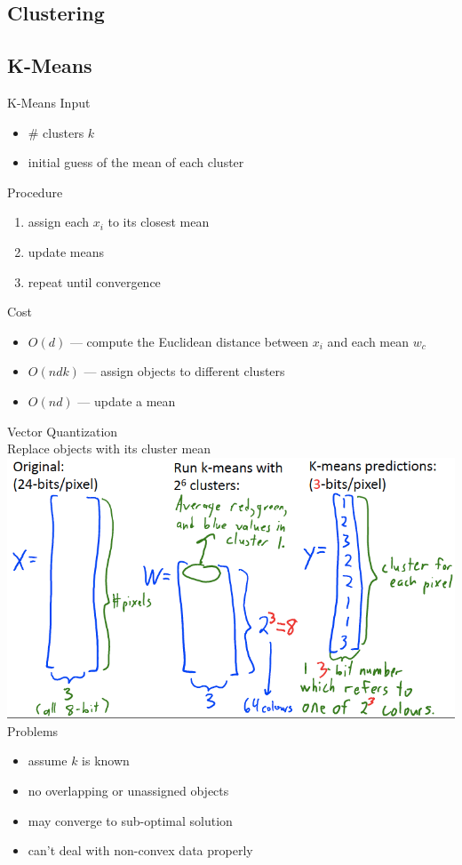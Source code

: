 \documentclass[10pt,landscape,a4paper]{article}
\begin{document}
\begin{multicols*}{5}
\section{Clustering}

\subsection{K-Means}
K-Means Input
\begin{itemize}
    \item \# clusters \(k\)
    \item initial guess of the mean of each cluster
\end{itemize}
Procedure
\begin{enumerate}
    \item assign each \(x_i\) to its closest mean
    \item update means
    \item repeat until convergence
\end{enumerate}
Cost
\begin{itemize}
    \item \(O(d)\) --- compute the Euclidean distance between \(x_i\) and each mean \(w_c\)
    \item \(O(ndk)\) --- assign objects to different clusters
    \item \(O(nd)\) --- update a mean
\end{itemize}
Vector Quantization \\
Replace objects with its cluster mean \\
\includegraphics[scale=0.2]{vector_quantization}
Problems
\begin{itemize}
    \item assume \(k\) is known
    \item no overlapping or unassigned objects
    \item may converge to sub-optimal solution
    \item can't deal with non-convex data properly
\end{itemize}


\end{multicols*}
\end{document}

